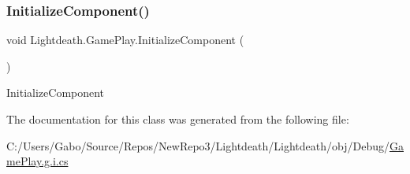 \subsubsection{\texorpdfstring{Initialize\+Component()}{InitializeComponent()}}
{\footnotesize\ttfamily void Lightdeath.\+Game\+Play.\+Initialize\+Component (\begin{DoxyParamCaption}{ }\end{DoxyParamCaption})\hspace{0.3cm}{\ttfamily [inline]}}



Initialize\+Component 



The documentation for this class was generated from the following file\+:\begin{DoxyCompactItemize}
\item 
C\+:/\+Users/\+Gabo/\+Source/\+Repos/\+New\+Repo3/\+Lightdeath/\+Lightdeath/obj/\+Debug/\hyperlink{_game_play_8g_8i_8cs}{Game\+Play.\+g.\+i.\+cs}\end{DoxyCompactItemize}
